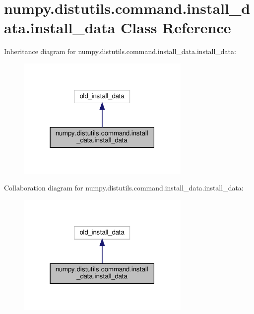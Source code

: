 \hypertarget{classnumpy_1_1distutils_1_1command_1_1install__data_1_1install__data}{}\section{numpy.\+distutils.\+command.\+install\+\_\+data.\+install\+\_\+data Class Reference}
\label{classnumpy_1_1distutils_1_1command_1_1install__data_1_1install__data}


Inheritance diagram for numpy.\+distutils.\+command.\+install\+\_\+data.\+install\+\_\+data\+:
\nopagebreak
\begin{figure}[H]
\begin{center}
\leavevmode
\includegraphics[width=237pt]{classnumpy_1_1distutils_1_1command_1_1install__data_1_1install__data__inherit__graph}
\end{center}
\end{figure}


Collaboration diagram for numpy.\+distutils.\+command.\+install\+\_\+data.\+install\+\_\+data\+:
\nopagebreak
\begin{figure}[H]
\begin{center}
\leavevmode
\includegraphics[width=237pt]{classnumpy_1_1distutils_1_1command_1_1install__data_1_1install__data__coll__graph}
\end{center}
\end{figure}
